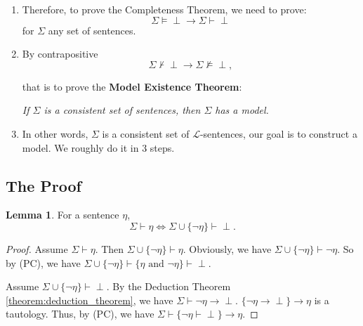 \documentclass[11pt,letterpaper]{book}
\theoremstyle{definition}
\newtheorem{lemma}{Lemma}[section]
\begin{document}
\begin{enumerate}
We will prove this statement by the following Lemma
\ref{lemma:not_true_deduce_contradictory}.

\item{Therefore, to prove the Completeness Theorem, we need to prove:
$$ \Sigma \models \perp \rightarrow \Sigma \vdash \perp  $$
for $\Sigma$ any set of sentences.
}

\item{By contrapositive
$$\Sigma \not \vdash \perp \rightarrow \Sigma \not \models \perp ,$$

that is to prove the \textbf{Model Existence Theorem}:

\emph{If $\Sigma$ is a consistent set of sentences, then $\Sigma$ has a
model.}

}

\item{In other words, $\Sigma$ is a consistent set of
$\mathcal{L}$-sentences, our goal is to construct a model. We roughly do
it in 3 steps.}


\end{enumerate}

\subsection{The Proof}

\begin{lemma}\label{lemma:not_true_deduce_contradictory}
For a sentence $\eta$, $$ \Sigma \vdash \eta \iff \Sigma \cup \{ \lnot
\eta \} \vdash \perp .$$
\end{lemma}

\begin{proof}
Assume $\Sigma \vdash \eta$. Then $\Sigma \cup \{ \lnot \eta \} \vdash
\eta$. Obviously, we have $\Sigma \cup \{ \lnot \eta \} \vdash \lnot
\eta$. So by (PC), we have $\Sigma \cup \{ \lnot \eta \} \vdash \{ \eta
\text{ and } \lnot \eta \} \vdash \perp $.

Assume $\Sigma \cup \{ \lnot \eta \} \vdash \perp$. By the Deduction
Theorem \ref{theorem:deduction_theorem}, we have $\Sigma \vdash \lnot
\eta \rightarrow \perp$. $\{ \lnot \eta \rightarrow \perp \}
\rightarrow \eta $ is a tautology. Thus, by (PC), we have $\Sigma \vdash 
\{\lnot \eta
\vdash \perp \} \rightarrow \eta $.
\end{proof}
\end{document}

